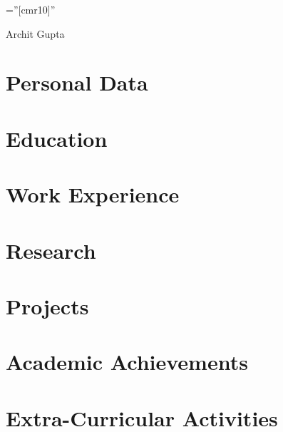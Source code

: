 \documentclass[a4paper,10pt]{article}
\begin{document}
\pagestyle{empty} %

\font\fb=''[cmr10]'' %

\par{\centering
		{\Huge Archit Gupta
}\par}


\section{Personal Data}


\section{Education}


\section{Work Experience}


\section{Research}


\section{Projects}


\section{Academic Achievements}


\section{Extra-Curricular Activities}

\end{document}
